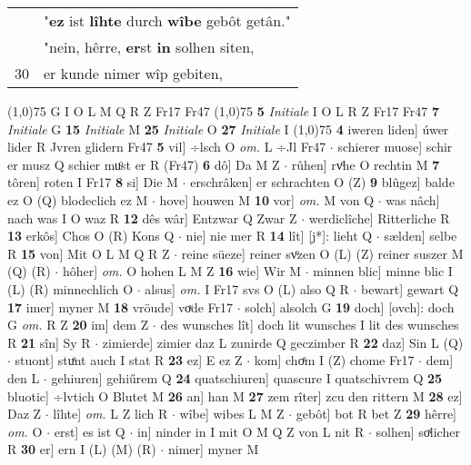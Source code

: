 \documentclass[8pt,a4paper,notitlepage]{article}
\begin{document}
\begin{table}[ht]
\begin{minipage}[t]{0.5\linewidth}
\begin{tabular}{rl}
 & "\textbf{ez} ist \textbf{lîhte} durch \textbf{wîbe} gebôt getân."\\ 
 & "nein, hêrre, \textbf{er}st \textbf{in} solhen siten,\\ 
30 & er kunde nimer wîp gebiten,\\ 
\end{tabular}
\scriptsize
\line(1,0){75} \newline
G I O L M Q R Z Fr17 Fr47 \newline
\line(1,0){75} \newline
\textbf{5} \textit{Initiale} I O L R Z Fr17 Fr47  \textbf{7} \textit{Initiale} G  \textbf{15} \textit{Initiale} M  \textbf{25} \textit{Initiale} O  \textbf{27} \textit{Initiale} I  \newline
\line(1,0){75} \newline
\textbf{4} iweren liden] úwer lider R Jvren glidern Fr47 \textbf{5} vil] ÷lsch O \textit{om.} L ÷Jl Fr47  $\cdot$ schierer muose] schir er musz Q schier muͦst er R (Fr47) \textbf{6} dô] Da M Z  $\cdot$ rûhen] rvͦhe O rechtin M \textbf{7} tôren] roten I Fr17 \textbf{8} si] Die M  $\cdot$ erschrâken] er schrachten O (Z) \textbf{9} blûgez] balde ez O (Q) blodeclich ez M  $\cdot$ hove] houwen M \textbf{10} vor] \textit{om.} M von Q  $\cdot$ was nâch] nach was I O waz R \textbf{12} dês wâr] Entzwar Q Zwar Z  $\cdot$ werdiclîche] Ritterliche R \textbf{13} erkôs] Chos O (R) Kons Q  $\cdot$ nie] nie mer R \textbf{14} lît] [j*]: lieht Q  $\cdot$ sælden] selbe R \textbf{15} von] Mit O L M Q R Z  $\cdot$ reine süeze] reiner svͦzen O (L) (Z) reiner suszer M (Q) (R)  $\cdot$ hôher] \textit{om.} O hohen L M Z \textbf{16} wie] Wir M  $\cdot$ minnen blic] minne blic I (L) (R) minnechlich O  $\cdot$ alsus] \textit{om.} I Fr17 svs O (L) also Q R  $\cdot$ bewart] gewart Q \textbf{17} imer] myner M \textbf{18} vröude] voͮde Fr17  $\cdot$ solch] alsolch G \textbf{19} doch] [ovch]: doch G \textit{om.} R Z \textbf{20} im] dem Z  $\cdot$ des wunsches lît] doch lit wunsches I lit des wunsches R \textbf{21} sîn] Sy R  $\cdot$ zimierde] zimier daz L zunirde Q geczimber R \textbf{22} daz] Sin L (Q)  $\cdot$ stuont] stuͤnt auch I stat R \textbf{23} ez] E ez Z  $\cdot$ kom] choͤm I (Z) chome Fr17  $\cdot$ dem] den L  $\cdot$ gehiuren] gehiűrem Q \textbf{24} quatschiuren] quascure I quatschivrem Q \textbf{25} bluotic] ÷lvtich O Blutet M \textbf{26} an] han M \textbf{27} zem rîter] zcu den rittern M \textbf{28} ez] Daz Z  $\cdot$ lîhte] \textit{om.} L Z lich R  $\cdot$ wîbe] wibes L M Z  $\cdot$ gebôt] bot R bet Z \textbf{29} hêrre] \textit{om.} O  $\cdot$ erst] es ist Q  $\cdot$ in] ninder in I mit O M Q Z von L nit R  $\cdot$ solhen] soͯlicher R \textbf{30} er] ern I (L) (M) (R)  $\cdot$ nimer] myner M \newline

\end{minipage}
\end{table}
\end{document}
